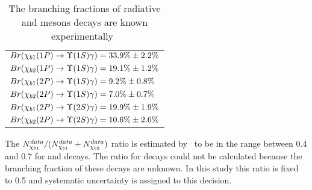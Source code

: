 \begin{table}[H]
\caption{The branching fractions of radiative \chibOneP and \chibTwoP mesons
decays are known experimentally~\cite{PDG2012}}
\centering
\begin{tabular}{l}
$Br(\chiboneOneP \to \Y1S \gamma) = 33.9\% \pm 2.2\%$ \\
$Br(\chibtwoOneP \to \Y1S \gamma) = 19.1\% \pm 1.2\%$ \\
$Br(\chiboneTwoP \to \Y1S \gamma) = 9.2\% \pm 0.8\%$ \\
$Br(\chibtwoTwoP \to \Y1S \gamma)  = 7.0\% \pm 0.7\%$ \\
$Br(\chiboneTwoP \to \Y2S \gamma) = 19.9\% \pm 1.9\%$ \\
$Br(\chibtwoTwoP \to \Y2S \gamma) = 10.6\% \pm 2.6\%$ \\
\end{tabular}
\label{tab:branching}
\end{table}

The $N_{\chi_{b 1}}^{data}/(N_{\chi_{b 1}}^{data} + N_{\chi_{b 2}}^{data})$ ratio is
estimated by~ to be in the range between 0.4 and 0.7 for
\chibOneP and \chibTwoP decays. The ratio for \chibThreeP decays could not be
calculated because the branching fraction of these decays are unknown. In this
study this ratio is fixed to 0.5 and systematic uncertainty is assigned to this
decision.

% 
